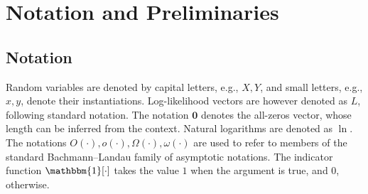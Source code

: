 \documentclass[conference,letterpaper]{IEEEtran}
\newcommand{\dorsa}[1]{ { \color{red} #1 - Dorsa} }
\newcommand{\indic}[1]{\mathbbm{1} [ #1] }
\begin{document}


\section{Notation and Preliminaries}
\subsection{Notation}
\label{sec:notation}
Random variables are denoted by capital letters, e.g., $X, Y$, and small letters, e.g., $x, y$, denote their instantiations. Log-likelihood vectors are however denoted as $L$, following standard notation.%
The notation $\mathbf{0}$ denotes the all-zeros vector, whose length can be inferred from the context.
Natural logarithms are denoted as $\ln$. The notations $O(\cdot), o(\cdot), \Omega(\cdot),\omega(\cdot)$ are used to refer to members of the standard  Bachmann–Landau family of asymptotic notations. The indicator function $\indic{\cdot}$ takes the value $1$ when the argument is true, and $0$, otherwise.
\end{document}
